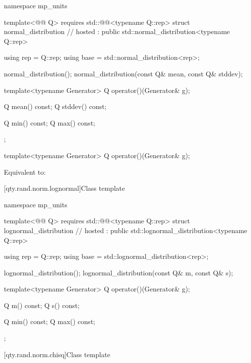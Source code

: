 \begin{codeblock}
namespace mp_units {
template<@@ Q>
  requires std::@@<typename Q::rep>
struct normal_distribution                                                              // hosted
    : public std::normal_distribution<typename Q::rep> {
  using rep = Q::rep;
  using base = std::normal_distribution<rep>;

  normal_distribution();
  normal_distribution(const Q& mean, const Q& stddev);

  template<typename Generator>
  Q operator()(Generator& g);

  Q mean() const;
  Q stddev() const;

  Q min() const;
  Q max() const;
};
}
\end{codeblock}

\begin{itemdecl}
template<typename Generator>
Q operator()(Generator& g);
\end{itemdecl}

\begin{itemdescr}
\pnum
\effects
Equivalent to:
\end{itemdescr}

[qty.rand.norm.lognormal]{Class template }

\begin{codeblock}
namespace mp_units {
template<@@ Q>
  requires std::@@<typename Q::rep>
struct lognormal_distribution                                                           // hosted
    : public std::lognormal_distribution<typename Q::rep> {
  using rep = Q::rep;
  using base = std::lognormal_distribution<rep>;

  lognormal_distribution();
  lognormal_distribution(const Q& m, const Q& s);

  template<typename Generator>
  Q operator()(Generator& g);

  Q m() const;
  Q s() const;

  Q min() const;
  Q max() const;
};
}
\end{codeblock}

[qty.rand.norm.chisq]{Class template }

